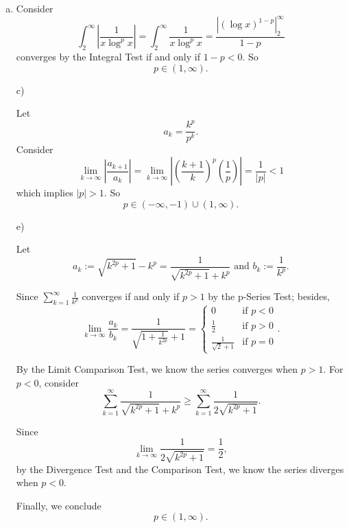 \begin{Exercise}
\begin{enumerate}[a)]
\item
\begin{solution}
Consider 
$$
\int_{2}^{\infty}\left|\frac{1}{x\log^p{x}}\right|
= \int_{2}^{\infty}\frac{1}{x\log^p{x}} 
= \frac{\left|(\log{x})^{1-p}\right|_{2}^{\infty}}{1-p} $$
converges by the Integral Test if and only if $1-p<0$. So $$
p \in (1,\infty).
$$
\end{solution}

\item [c)]
\begin{solution}
Let 
$$
a_k = \frac{k^p}{p^k}. 
$$
Consider
$$
\lim_{k\to\infty}\left|\frac{a_{k+1}}{a_k}\right| 
= \lim_{k\to\infty}\left|\left(\frac{k+1}{k}\right)^p\left(\frac{1}{p}\right)\right| 
= \frac{1}{|p|} 
< 1
$$
which implies $|p|>1$. So
$$
p\in(-\infty,-1)\cup (1,\infty).
$$
\end{solution}

\item [e)]
\begin{solution}
Let 
$$
a_k := \sqrt{k^{2p}+1}-k^p 
= \frac{1}{\sqrt{k^{2p}+1}+k^p}\text{ and } 
b_k := \frac{1}{k^p}.
$$

Since $\sum_{k=1}^{\infty}\frac{1}{k^p}$ converges if and only if $p>1$ by the p-Series Test; besides,
$$
\lim_{k\to\infty}\frac{a_k}{b_k} 
= \frac{1}{\sqrt{1+\frac{1}{k^{2p}}}+1} 
= 
\begin{cases}
0 & \mbox{if }p<0 \\ 
\frac{1}{2} & \mbox{if }p>0 \\ 
\frac{1}{\sqrt{2}+1} & \mbox{if } p = 0
\end{cases}.
$$

By the Limit Comparison Test, we know the series converges when $p>1$. For $p<0$, consider 
$$
\sum_{k=1}^{\infty}\frac{1}{\sqrt{k^{2p}+1}+k^p} 
\geq \sum_{k=1}^{\infty}\frac{1}{2\sqrt{k^{2p}+1}}.
$$

Since 
$$
\lim_{k\to\infty}\frac{1}{2\sqrt{k^{2p}+1}} 
= \frac{1}{2},
$$
by the Divergence Test and the Comparison Test, we know the series diverges when $p<0$.

Finally, we conclude 
$$
p\in(1,\infty).
$$
\end{solution}
\end{enumerate}
\end{Exercise}